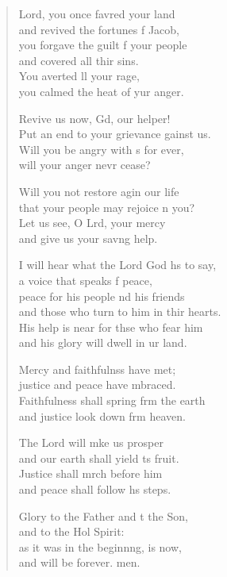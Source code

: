\settowidth{\versewidth}{I will hear what the Lord God has to say, *}
\begin{verse}%
  \begin{patverse}
 Lord, you once favred your land\Med\\
and revived the fortunes f Jacob,\\
you forgave the guilt f your people\Med\\
and covered all thir sins.\\
You averted ll your rage,\Med\\
you calmed the heat of yur anger.

Revive us now, Gd, our helper!\Med\\
Put an end to your grievance gainst us.\\
Will you be angry with s for ever,\Med\\
will your anger nevr cease?

Will you not restore agin our life\Med\\
that your people may rejoice \pointup{\i}n you?\\
Let us see, O Lrd, your mercy\Med\\
and give us your sav\pointup{\i}ng help.

I will hear what the Lord God hs to say,\Med\\
a voice that speaks f peace,\\
peace for his people nd his friends\Med\\
and those who turn to him in thir hearts.\\
His help is near for thse who fear him\Med\\
and his glory will dwell in ur land.

Mercy and faithfulnss have met;\Med\\
justice and peace have mbraced.\\
Faithfulness shall spring frm the earth\Med\\
and justice look down frm heaven.

The Lord will mke us prosper\Med\\
and our earth shall yield \pointup{\i}ts fruit.\\
Justice shall mrch before him\Med\\
and peace shall follow h\pointup{\i}s steps.

Glory to the Father and t the Son,\Med\\
and to the Hol Spirit:\\
as it was in the beginn\pointup{\i}ng, is now,\Med\\
and will be forever. men.
  \end{patverse}
\end{verse}
